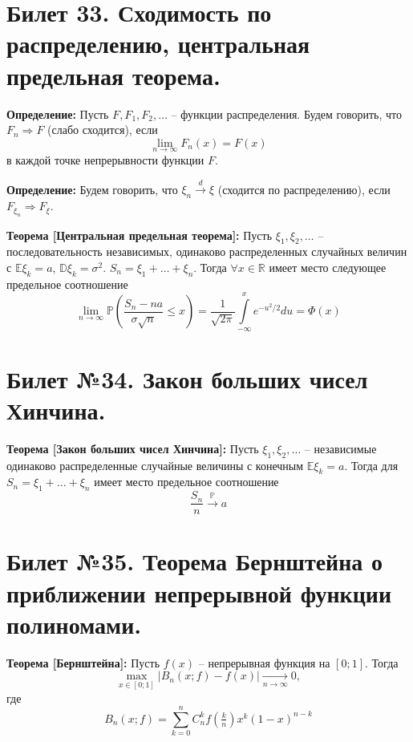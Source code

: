 	\section{Билет 33. Сходимость по распределению, центральная предельная теорема.}
	
	\hspace{\parindent}\textbf{Определение:} Пусть $F, F_1, F_2, \dots$ -- функции распределения. Будем говорить, что $F_n \Rightarrow F$ (слабо сходится), если 
	\[
	\lim\limits_{n\to\infty} F_n(x) = F(x) 
	\]
	в каждой точке непрерывности функции $F$.
	
	\vspace{5mm}
	
	\textbf{Определение:} Будем говорить, что $\xi_n \xrightarrow{d} \xi$ (сходится по распределению), если $F_{\xi_n} \Rightarrow F_{\xi}$.
	\vspace{5mm}
	
	\textbf{Теорема [Центральная предельная теорема]:} Пусть $\xi_1, \xi_2, \dots$ -- последовательность независимых, одинаково распределенных случайных величин с $\mathbb{E}\xi_k = a$, $\mathbb{D}\xi_k = \sigma^2$. $S_n = \xi_1+\dots+\xi_n$. Тогда $\forall x\in\mathbb{R}$ имеет место следующее предельное соотношение
	\[
	\lim\limits_{n\to\infty}\mathbb{P}\left(\frac{S_n - na}{\sigma \sqrt{n}} \leqslant x  \right) = \frac{1}{\sqrt{2\pi}}\int\limits_{-\infty}^x e^{-u^2/2}du = \Phi(x)	
	\]
	
\section{Билет №34. Закон больших чисел Хинчина.}

\hspace*{\parindent} \textbf{Теорема [Закон больших чисел Хинчина]:} Пусть $\xi_1, \xi_2, \ldots$ -- независимые одинаково распределенные случайные величины с конечным $\mathbb{E} \xi_k = a$. Тогда для $S_n = \xi_1 + \ldots + \xi_n$ имеет место предельное соотношение
\[\dfrac{S_n}{n} \xrightarrow{\mathbb{P}} a \]

\section{Билет №35. Теорема Бернштейна о приближении непрерывной функции полиномами.}

\hspace*{\parindent} \textbf{Теорема [Бернштейна]:} Пусть $f(x)$ -- непрерывная функция на $[0; 1]$. Тогда 
\[\max_{x \in [0; 1]} |B_n(x; f) - f(x)| \xrightarrow[n \to \infty]{} 0, \]
где 
\[B_n(x; f) = \sum_{k=0}^{n} C_{n}^{k} f \left( \tfrac{k}{n} \right) x^k (1-x)^{n-k} \]

